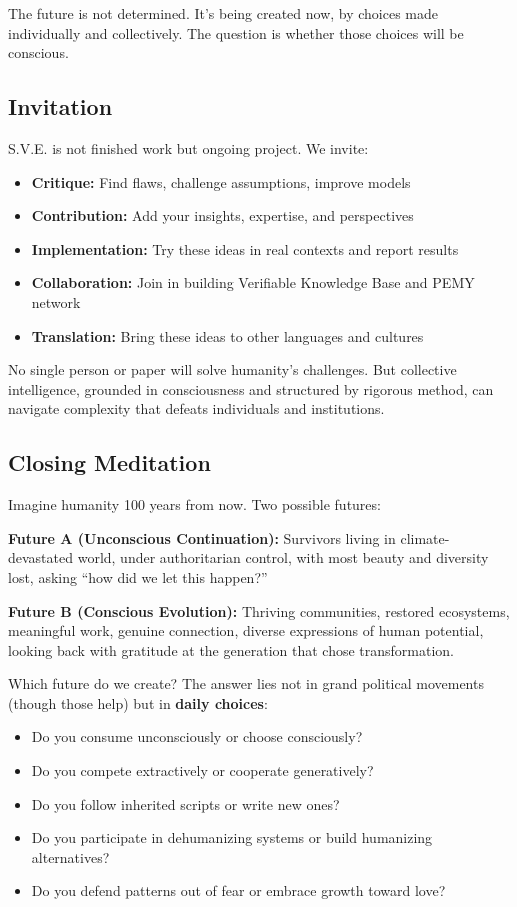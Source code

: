 \documentclass[11pt,a4paper]{article}
\theoremstyle{definition}
\theoremstyle{remark}
\begin{document}
The future is not determined. It's being created now, by choices made individually and collectively. The question is whether those choices will be conscious.

\subsection{Invitation}

S.V.E. is not finished work but ongoing project. We invite:

\begin{itemize}
    \item \textbf{Critique:} Find flaws, challenge assumptions, improve models
    \item \textbf{Contribution:} Add your insights, expertise, and perspectives
    \item \textbf{Implementation:} Try these ideas in real contexts and report results
    \item \textbf{Collaboration:} Join in building Verifiable Knowledge Base and PEMY network
    \item \textbf{Translation:} Bring these ideas to other languages and cultures
\end{itemize}

No single person or paper will solve humanity's challenges. But collective intelligence, grounded in consciousness and structured by rigorous method, can navigate complexity that defeats individuals and institutions.

\subsection{Closing Meditation}

Imagine humanity 100 years from now. Two possible futures:

\textbf{Future A (Unconscious Continuation):}
Survivors living in climate-devastated world, under authoritarian control, with most beauty and diversity lost, asking ``how did we let this happen?''

\textbf{Future B (Conscious Evolution):}
Thriving communities, restored ecosystems, meaningful work, genuine connection, diverse expressions of human potential, looking back with gratitude at the generation that chose transformation.

Which future do we create? The answer lies not in grand political movements (though those help) but in \textbf{daily choices}:

\begin{itemize}
    \item Do you consume unconsciously or choose consciously?
    \item Do you compete extractively or cooperate generatively?
    \item Do you follow inherited scripts or write new ones?
    \item Do you participate in dehumanizing systems or build humanizing alternatives?
    \item Do you defend patterns out of fear or embrace growth toward love?
\end{itemize}
\end{document}
